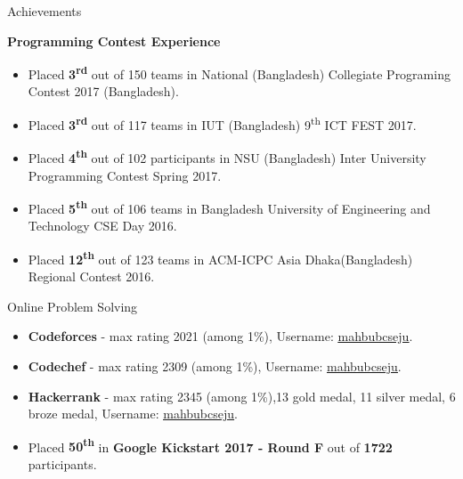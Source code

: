 \documentclass[]{mcdowellcv}
\def\first{8pt}
\begin{document}
	\begin{cvsection}{Achievements}
		\begin{cvsubsection}{}{}{}
		    \begin{description}
		     \vspace*{\first}
		     \hspace*{-8pt}\textbf{Programming Contest Experience}
		    \end{description}
			\begin{itemize}
				\item Placed \textbf{3\textsuperscript{rd}} out of 150 teams in National (Bangladesh) Collegiate Programing Contest 2017 (Bangladesh).
				\item Placed \textbf{3\textsuperscript{rd}} out of 117 teams in IUT (Bangladesh) 9\textsuperscript{th} ICT FEST 2017.
				\item Placed \textbf{4\textsuperscript{th}} out of 102 participants in NSU (Bangladesh) Inter University Programming Contest Spring 2017.
				\item Placed \textbf{5\textsuperscript{th}} out of 106 teams in Bangladesh University of Engineering and Technology CSE Day 2016.
				\item Placed \textbf{12\textsuperscript{th}} out of 123 teams in ACM-ICPC Asia Dhaka(Bangladesh) Regional Contest 2016.
			\end{itemize}
		\end{cvsubsection}
		\begin{cvsubsection}{\hspace*{\first}Online Problem Solving}{}{}
			\begin{itemize}
			    \item \textbf{Codeforces} - max rating 2021 (among 1\%), Username: \href{https://codeforces.com/profile/mahbubcseju}{\underline{mahbubcseju}}.
			     \item \textbf{Codechef} - max rating 2309 (among 1\%), Username: \href{https://www.codechef.com/users/mahbubcseju}{\underline{mahbubcseju}}.
			     \item \textbf{Hackerrank} - max rating 2345 (among 1\%),13 gold medal, 11 silver medal, 6 broze medal, Username: \href{https://www.hackerrank.com/profile/mahbubcseju}{\underline{mahbubcseju}}.
			    \item Placed \textbf{50\textsuperscript{th}} in \textbf{Google Kickstart 2017 - Round F} out of \textbf{1722} participants.
			\end{itemize}
		\end{cvsubsection}
	\end{cvsection}
	
\end{document}
